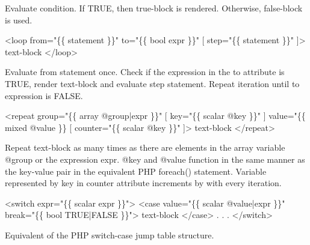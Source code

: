 \begin{DoxyItemize}
\item Evaluate condition. If {\ttfamily T\+R\+UE}, then {\ttfamily true-\/block} is rendered. Otherwise, {\ttfamily false-\/block} is used.
\end{DoxyItemize}


\begin{DoxyCode}
<loop
    from="\{\{ statement \}\}"
    to="\{\{ bool expr \}\}"
    [ step="\{\{ statement \}\}" ]>
    text-block
</loop>
\end{DoxyCode}

\begin{DoxyItemize}
\item Evaluate {\ttfamily from} statement once. Check if the expression in the {\ttfamily to} attribute is {\ttfamily T\+R\+UE}, render {\ttfamily text-\/block} and evaluate {\ttfamily step} statement. Repeat iteration until {\ttfamily to} expression is {\ttfamily F\+A\+L\+SE}.
\end{DoxyItemize}


\begin{DoxyCode}
<repeat
    group="\{\{ array @group|expr \}\}"
    [ key="\{\{ scalar @key \}\}" ]
    value="\{\{ mixed @value \}\}
    [ counter="\{\{ scalar @key \}\}" ]>
    text-block
</repeat>
\end{DoxyCode}

\begin{DoxyItemize}
\item Repeat {\ttfamily text-\/block} as many times as there are elements in the array variable {\ttfamily @group} or the expression {\ttfamily expr}. {\ttfamily @key} and {\ttfamily @value} function in the same manner as the key-\/value pair in the equivalent P\+HP {\ttfamily foreach()} statement. Variable represented by {\ttfamily key} in {\ttfamily counter} attribute increments by {} with every iteration.
\end{DoxyItemize}


\begin{DoxyCode}
<switch expr="\{\{ scalar expr \}\}">
    <case value="\{\{ scalar @value|expr \}\}" break="\{\{ bool TRUE|FALSE \}\}">
        text-block
    </case>
    .
    .
    .
</switch>
\end{DoxyCode}

\begin{DoxyItemize}
\item Equivalent of the P\+HP switch-\/case jump table structure.
\end{DoxyItemize}



